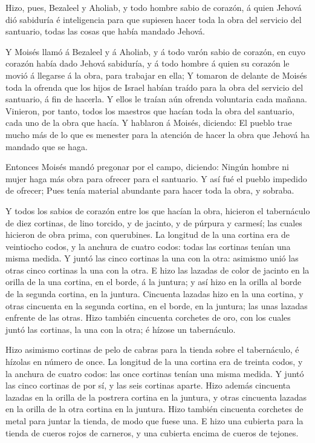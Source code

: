  Hizo, pues, Bezaleel y Aholiab, y todo hombre sabio de
corazón, á quien Jehová dió sabiduría é inteligencia para que supiesen
hacer toda la obra del servicio del santuario, todas las cosas que había
mandado Jehová.

 Y Moisés llamó á Bezaleel y á Aholiab, y á todo varón sabio
de corazón, en cuyo corazón había dado Jehová sabiduría, y á todo hombre
á quien su corazón le movió á llegarse á la obra, para trabajar en ella;
 Y tomaron de delante de Moisés toda la ofrenda que los
hijos de Israel habían traído para la obra del servicio del santuario, á
fin de hacerla. Y ellos le traían aún ofrenda voluntaria cada mañana.
 Vinieron, por tanto, todos los maestros que hacían toda la
obra del santuario, cada uno de la obra que hacía.  Y
hablaron á Moisés, diciendo: El pueblo trae mucho más de lo que es
menester para la atención de hacer la obra que Jehová ha mandado que se
haga.

 Entonces Moisés mandó pregonar por el campo, diciendo:
Ningún hombre ni mujer haga más obra para ofrecer para el santuario. Y
así fué el pueblo impedido de ofrecer;  Pues tenía material
abundante para hacer toda la obra, y sobraba.

 Y todos los sabios de corazón entre los que hacían la obra,
hicieron el tabernáculo de diez cortinas, de lino torcido, y de jacinto,
y de púrpura y carmesí; las cuales hicieron de obra prima, con
querubines.  La longitud de la una cortina era de veintiocho
codos, y la anchura de cuatro codos: todas las cortinas tenían una misma
medida.  Y juntó las cinco cortinas la una con la otra:
asimismo unió las otras cinco cortinas la una con la otra. 
E hizo las lazadas de color de jacinto en la orilla de la una cortina,
en el borde, á la juntura; y así hizo en la orilla al borde de la
segunda cortina, en la juntura.  Cincuenta lazadas hizo en
la una cortina, y otras cincuenta en la segunda cortina, en el borde, en
la juntura; las unas lazadas enfrente de las otras.  Hizo
también cincuenta corchetes de oro, con los cuales juntó las cortinas,
la una con la otra; é hízose un tabernáculo.

 Hizo asimismo cortinas de pelo de cabras para la tienda
sobre el tabernáculo, é hízolas en número de once.  La
longitud de la una cortina era de treinta codos, y la anchura de cuatro
codos: las once cortinas tenían una misma medida.  Y juntó
las cinco cortinas de por sí, y las seis cortinas aparte. 
Hizo además cincuenta lazadas en la orilla de la postrera cortina en la
juntura, y otras cincuenta lazadas en la orilla de la otra cortina en la
juntura.  Hizo también cincuenta corchetes de metal para
juntar la tienda, de modo que fuese una.  E hizo una
cubierta para la tienda de cueros rojos de carneros, y una cubierta
encima de cueros de tejones.

